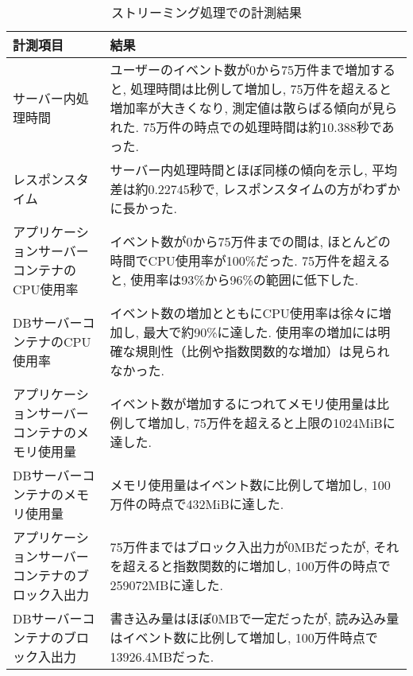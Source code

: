 \documentclass[../../../main]{subfiles}
\begin{document}
    \begin{table}[H]
        \centering
        \caption{ストリーミング処理での計測結果}
        \label{tab:result-streaming}
        \begin{tabular}{|p{4cm}|p{10cm}|}
            \hline
            \textbf{計測項目}                & \textbf{結果}                                                                                                              \\ \hline
            サーバー内処理時間                    & ユーザーのイベント数が0から75万件まで増加すると, 処理時間は比例して増加し, 75万件を超えると増加率が大きくなり, 測定値は散らばる傾向が見られた. 75万件の時点での処理時間は約10.388秒であった.                     \\ \hline
            レスポンスタイム                     & サーバー内処理時間とほぼ同様の傾向を示し, 平均差は約0.22745秒で, レスポンスタイムの方がわずかに長かった.                                                                  \\ \hline
            アプリケーションサーバーコンテナのCPU使用率      & イベント数が0から75万件までの間は, ほとんどの時間でCPU使用率が100\%だった. 75万件を超えると, 使用率は93\%から96\%の範囲に低下した.                                              \\ \hline
            DBサーバーコンテナのCPU使用率            & イベント数の増加とともにCPU使用率は徐々に増加し, 最大で約90\%に達した. 使用率の増加には明確な規則性（比例や指数関数的な増加）は見られなかった.                                               \\ \hline
            アプリケーションサーバーコンテナのメモリ使用量      & イベント数が増加するにつれてメモリ使用量は比例して増加し, 75万件を超えると上限の1024MiBに達した.                                                                     \\ \hline
            DBサーバーコンテナのメモリ使用量            & メモリ使用量はイベント数に比例して増加し, 100万件の時点で432MiBに達した.                                                                                 \\ \hline
            アプリケーションサーバーコンテナのブロック入出力     & 75万件まではブロック入出力が0MBだったが, それを超えると指数関数的に増加し, 100万件の時点で259072MBに達した.                                                            \\ \hline
            DBサーバーコンテナのブロック入出力           & 書き込み量はほぼ0MBで一定だったが, 読み込み量はイベント数に比例して増加し, 100万件時点で13926.4MBだった.                                                              \\ \hline

\end{tabular}
\end{table}
\end{document}
